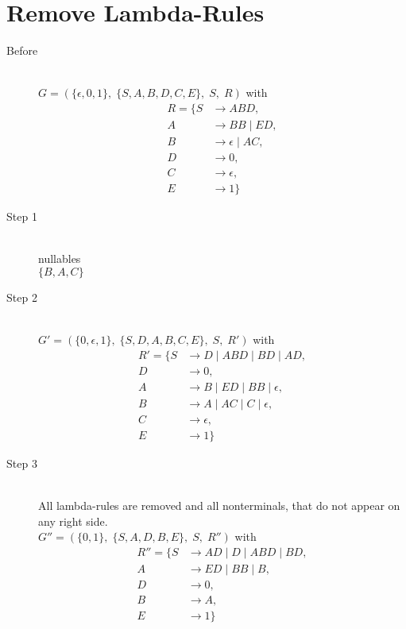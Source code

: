 \documentclass{article}
\begin{document}
\section{Remove Lambda-Rules}

\begin{description}
	\item[Before] \hfill \\ 
		$G=\left(\{	\epsilon, 0, 1\},\;\{ S, A, B, D, C, E\},\;S,\;R\right)$ with
	\begin{align*}
		R=\{	S &\rightarrow ABD, \\ 
		A &\rightarrow BB\;|\;ED, \\ 
		B &\rightarrow \epsilon\;|\;AC, \\ 
		D &\rightarrow 0, \\ 
		C &\rightarrow \epsilon, \\ 
		E &\rightarrow 1\}
	\end{align*}
	\item[Step 1] \hfill \\ 
	nullables\\ 
	$\{	B, 	A, 	C\}$
	\item[Step 2] \hfill \\ 
		$G'=\left(\{	0, \epsilon, 1\},\;\{ S, D, A, B, C, E\},\;S,\;R'\right)$ with
	\begin{align*}
		R'=\{	S &\rightarrow D\;|\;ABD\;|\;BD\;|\;AD, \\ 
		D &\rightarrow 0, \\ 
		A &\rightarrow B\;|\;ED\;|\;BB\;|\;\epsilon, \\ 
		B &\rightarrow A\;|\;AC\;|\;C\;|\;\epsilon, \\ 
		C &\rightarrow \epsilon, \\ 
		E &\rightarrow 1\}
	\end{align*}
	\item[Step 3] \hfill \\ 
	All lambda-rules are removed and all nonterminals, that do not appear on any right side.\\ 
	$G''=\left(\{	0, 1\},\;\{ S, A, D, B, E\},\;S,\;R''\right)$ with
	\begin{align*}
		R''=\{	S &\rightarrow AD\;|\;D\;|\;ABD\;|\;BD, \\ 
		A &\rightarrow ED\;|\;BB\;|\;B, \\ 
		D &\rightarrow 0, \\ 
		B &\rightarrow A, \\ 
		E &\rightarrow 1\}
	\end{align*}
\end{description}
\end{document}
